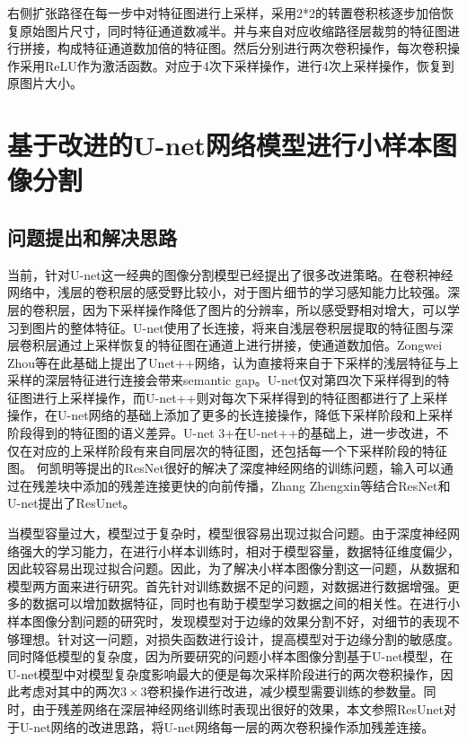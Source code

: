 \documentclass[AutoFakeBold]{LZUThesis}
\begin{document}
右侧扩张路径在每一步中对特征图进行上采样，采用2*2的转置卷积核逐步加倍恢复原始图片尺寸，同时特征通道数减半。并与来自对应收缩路径层裁剪的特征图进行拼接，构成特征通道数加倍的特征图。然后分别进行两次卷积操作，每次卷积操作采用ReLU作为激活函数。对应于4次下采样操作，进行4次上采样操作，恢复到原图片大小。



\chapter{基于改进的U-net网络模型进行小样本图像分割}

\section{问题提出和解决思路}
当前，针对U-net这一经典的图像分割模型已经提出了很多改进策略。在卷积神经网络中，浅层的卷积层的感受野比较小，对于图片细节的学习感知能力比较强。深层的卷积层，因为下采样操作降低了图片的分辨率，所以感受野相对增大，可以学习到图片的整体特征。U-net使用了长连接，将来自浅层卷积层提取的特征图与深层卷积层通过上采样恢复的特征图在通道上进行拼接，使通道数加倍。Zongwei Zhou等在此基础上提出了Unet++网络\textsuperscript{\cite{zhou2018unet++}}，认为直接将来自于下采样的浅层特征与上采样的深层特征进行连接会带来semantic gap。U-net仅对第四次下采样得到的特征图进行上采样操作，而U-net++则对每次下采样得到的特征图都进行了上采样操作，在U-net网络的基础上添加了更多的长连接操作，降低下采样阶段和上采样阶段得到的特征图的语义差异。U-net 3+\textsuperscript{\cite{huang2020unet}}在U-net++的基础上，进一步改进，不仅在对应的上采样阶段有来自同层次的特征图，还包括每一个下采样阶段的特征图。
何凯明等提出的ResNet\textsuperscript{\cite{he2016deep}}很好的解决了深度神经网络的训练问题，输入可以通过在残差块中添加的残差连接更快的向前传播，Zhang Zhengxin等结合ResNet和U-net提出了ResUnet\textsuperscript{\cite{zhang2018road}}。

当模型容量过大，模型过于复杂时，模型很容易出现过拟合问题\textsuperscript{\cite{goodfellow2016deep}}。由于深度神经网络强大的学习能力，在进行小样本训练时，相对于模型容量，数据特征维度偏少，因此较容易出现过拟合问题。因此，为了解决小样本图像分割这一问题，从数据和模型两方面来进行研究。首先针对训练数据不足的问题，对数据进行数据增强。更多的数据可以增加数据特征，同时也有助于模型学习数据之间的相关性。在进行小样本图像分割问题的研究时，发现模型对于边缘的效果分割不好，对细节的表现不够理想。针对这一问题，对损失函数进行设计，提高模型对于边缘分割的敏感度。同时降低模型的复杂度，因为所要研究的问题小样本图像分割基于U-net模型，在U-net模型中对模型复杂度影响最大的便是每次采样阶段进行的两次卷积操作，因此考虑对其中的两次$3\times 3$卷积操作进行改进，减少模型需要训练的参数量。同时，由于残差网络在深层神经网络训练时表现出很好的效果，本文参照ResUnet对于U-net网络的改进思路，将U-net网络每一层的两次卷积操作添加残差连接。
\end{document}
